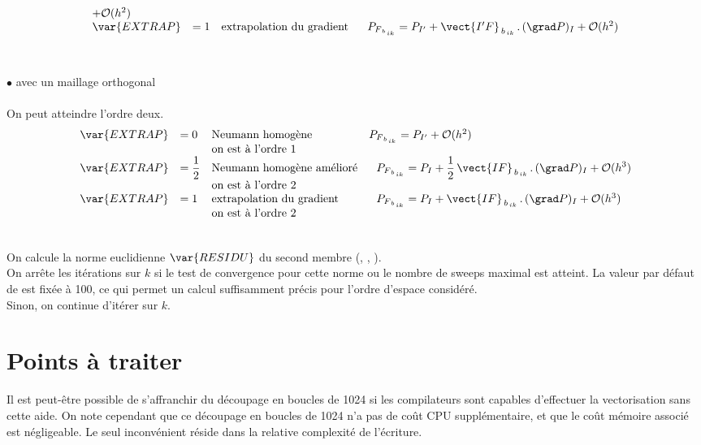 {\begin{equation}
\begin{array}{llll}
+ \mathcal{O}(h^2)\\
\var{EXTRAP} &= 1&\text{extrapolation du gradient}&\ \
P_{F_{\,b_{\,ik}}} = P_{I'} + \vect{I'F}_{\,b_{\,ik}}\,.\,(\grad P)_{I} + \mathcal{O}(h^2)\\
\end{array}
\end{equation}\\\\
\hspace*{2cm}$\bullet $ avec un maillage orthogonal \\\\
On peut atteindre l'ordre deux.\\
\begin{equation}\notag
\begin{array}{lllll}
\var{EXTRAP} &= 0 &\text{Neumann homog\`ene}&
P_{F_{\,b_{\,ik}}}  = P_{I'} + \mathcal{O}(h^2)\\
&\ &\text{on est \`a l'ordre 1}\\
\var{EXTRAP} &=  \displaystyle\frac{1}{2} &\text{Neumann homog\`ene am\'elior\'e}&\ \
P_{F_{\,b_{\,ik}}}  = P_{I} + \displaystyle\frac{1}{2}\,\vect{IF}_{\,b_{\,ik}}\,.\,(\grad P)_{I}
+ \mathcal{O}(h^3)\\
&\ &\text{on est \`a l'ordre 2}\\
\var{EXTRAP} &= 1 &\text{extrapolation du gradient}&\ \
P_{F_{\,b_{\,ik}}}  = P_{I} + \vect{IF}_{\,b_{\,ik}}\,.\,(\grad P)_{I} +
\mathcal{O}(h^3)\\
&\ &\text{on est \`a l'ordre 2}\\
\end{array}
\end{equation}

\hspace*{1,5cm}{\bf Test de convergence de la m\'ethode it\'erative de r\'esolution}\\
On calcule la norme euclidienne $\var {RESIDU}$ du second membre (,
, ).\\
On arr\^ete les it\'erations sur $k$ si le test de
convergence pour cette norme ou le nombre de
sweeps maximal  est atteint. La valeur par d\'efaut de   est fix\'ee \`a 100, ce
qui permet un calcul suffisamment pr\'ecis pour l'ordre d'espace
consid\'er\'e.\\
Sinon, on continue d'it\'erer sur $k$.
\section*{Points \`a traiter}
\etape{Vectorisation forc\'ee}
Il est peut-\^etre possible de s'affranchir du d\'ecoupage en boucles de 1024 si
les compilateurs sont capables
d'effectuer la vectorisation sans cette aide. On note cependant que ce
d\'ecoupage en boucles de 1024 n'a pas de co\^ut CPU suppl\'ementaire, et que
le co\^ut m\'emoire associ\'e est n\'egligeable.
Le seul inconv\'enient r\'eside dans la relative complexit\'e  de l'\'ecriture.

}
